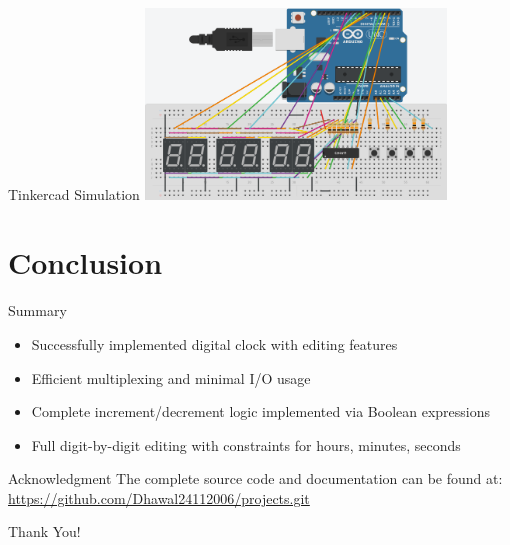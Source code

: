 \documentclass{beamer}
\begin{document}
\begin{frame}{Tinkercad Simulation}
\centering
\includegraphics[width=0.6\textwidth]{figs/Clock_Tinkercad.png}
\caption{Clock Tinkercad Simulation}
\end{frame}

\section{Conclusion}
\begin{frame}{Summary}
\begin{itemize}
    \item Successfully implemented digital clock with editing features
    \item Efficient multiplexing and minimal I/O usage
    \item Complete increment/decrement logic implemented via Boolean expressions
    \item Full digit-by-digit editing with constraints for hours, minutes, seconds
\end{itemize}
\end{frame}

\begin{frame}{Acknowledgment}
\centering
The complete source code and documentation can be found at:\\
\url{https://github.com/Dhawal24112006/projects.git}

\vspace{1cm}
Thank You!
\end{frame}
\end{document}
